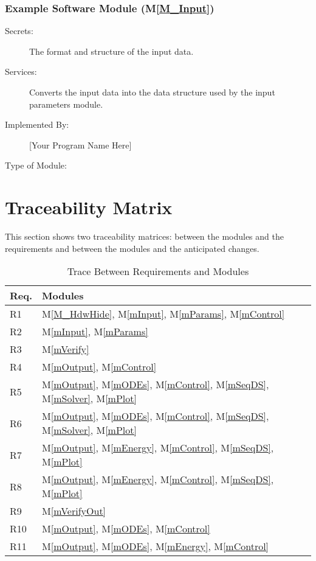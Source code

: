 \documentclass[12pt, titlepage]{article}
\newcommand{\mref}[1]{M\ref{#1}}
\begin{document}
\subsubsection{Example Software Module (\mref{M_Input})}
\begin{description}
\item[Secrets:]The format and structure of the input data.
\item[Services:]Converts the input data into the data structure used by the
  input parameters module.
\item[Implemented By:] [Your Program Name Here]
\item[Type of Module:] 
\end{description}


\section{Traceability Matrix} \label{SecTM}

This section shows two traceability matrices: between the modules and the
requirements and between the modules and the anticipated changes.

\begin{table}[H]
\centering
\begin{tabular}{p{} p{}}
\toprule
\textbf{Req.} & \textbf{Modules}\\
\midrule
R1 & \mref{M_HdwHide}, \mref{mInput}, \mref{mParams}, \mref{mControl}\\
R2 & \mref{mInput}, \mref{mParams}\\
R3 & \mref{mVerify}\\
R4 & \mref{mOutput}, \mref{mControl}\\
R5 & \mref{mOutput}, \mref{mODEs}, \mref{mControl}, \mref{mSeqDS}, \mref{mSolver}, \mref{mPlot}\\
R6 & \mref{mOutput}, \mref{mODEs}, \mref{mControl}, \mref{mSeqDS}, \mref{mSolver}, \mref{mPlot}\\
R7 & \mref{mOutput}, \mref{mEnergy}, \mref{mControl}, \mref{mSeqDS}, \mref{mPlot}\\
R8 & \mref{mOutput}, \mref{mEnergy}, \mref{mControl}, \mref{mSeqDS}, \mref{mPlot}\\
R9 & \mref{mVerifyOut}\\
R10 & \mref{mOutput}, \mref{mODEs}, \mref{mControl}\\
R11 & \mref{mOutput}, \mref{mODEs}, \mref{mEnergy}, \mref{mControl}\\
\bottomrule
\end{tabular}
\caption{Trace Between Requirements and Modules}
\label{TblRT}
\end{table}
\end{document}
